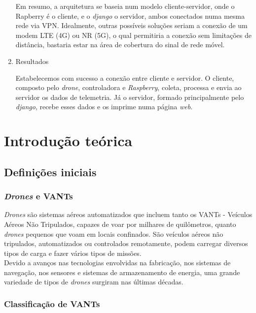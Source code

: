 \documentclass[12pt,a4paper,oneside]{book}
\begin{document}
\begin{enumerate}
     Em resumo, a
     arquitetura se baseia num modelo cliente-servidor, onde o Rapberry
     é o cliente, e o \textit{django} o servidor, ambos conectados numa mesma
     rede via VPN. Idealmente, outras possíveis soluções seriam a conexão de
     um modem LTE (4G) ou NR (5G), o qual permitiria a conexão sem limitações de 
     distância, bastaria estar na área de cobertura do sinal de rede móvel.

     \item Resultados
     
     Estabelecemos com sucesso a conexão entre cliente e servidor. O cliente, composto
     pelo \textit{drone}, controladora e \textit{Raspberry}, coleta, processa e envia ao servidor os
     dados de telemetria. Já o servidor, formado principalmente pelo \textit{django},
     recebe esses dados e os imprime numa página \textit{web}.



\end{enumerate}




%

\chapter{Introdução teórica}
%
\thispagestyle{empty} 
%


\section{Definições iniciais}

\subsection{\textit{Drones} e VANTs}
\textit{Drones} são sistemas aéreos automatizados que incluem tanto os VANTs - Veículos Aéreos Não Tripulados, capazes de voar por milhares de 
quilômetros, quanto \textit{drones} pequenos que voam em locais confinados. São veículos aéreos não tripulados, automatizados ou controlados 
remotamente, podem carregar diversos tipos de carga e fazer vários tipos de missões.\\
Devido a avanços nas tecnologias envolvidas na fabricação, nos sistemas de navegação, nos sensores e sistemas de armazenamento de 
energia, uma grande variedade de tipos de \textit{drones} surgiram nas últimas décadas. 

\subsection{Classificação de VANTs}
\end{document}
